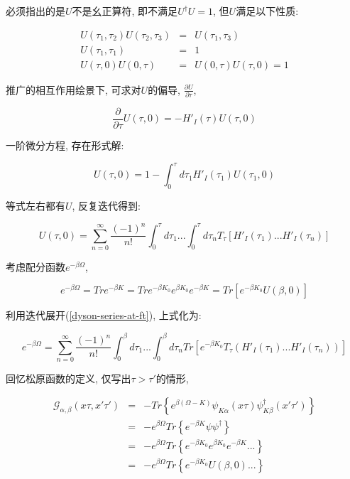 必须指出的是$U$不是幺正算符, 即不满足$U^\dagger U =1$,
但$U$满足以下性质:

\begin{eqnarray*}
  U(\tau_1, \tau_2) U(\tau_2, \tau_3) &=& U(\tau_1, \tau_3) \\
  U(\tau_1, \tau_1) &=& 1 \\
  U(\tau, 0)U(0, \tau) &=& U(0, \tau) U(\tau, 0) =  1
\end{eqnarray*}

推广的相互作用绘景下, 可求对$U$的偏导, $\frac{\partial U}{\partial
\tau}$,

\begin{equation}\label{time-evolution-of-U-tau}
\frac{\partial }{\partial \tau} U (\tau, 0) = - H'_I (\tau) U(\tau,
0)
\end{equation}

一阶微分方程, 存在形式解:

\begin{equation*}
U(\tau, 0) = 1 - \int_0^\tau d\tau_1 H'_I (\tau_1) U(\tau_1,0)
\end{equation*}

等式左右都有$U$, 反复迭代得到:

\begin{equation}\label{dyson-series-at-ft}
U(\tau,0) = \sum_{n=0}^\infty \frac{(-1)^n}{n!} \int_0^\tau d\tau_1
...\int_0^\tau d\tau_n T_\tau \left[ H'_I(\tau_1)...H'_I (\tau_n)
\right]
\end{equation}

考虑配分函数$e^{-\beta \Omega}$,

\begin{equation*}
e^{-\beta \Omega} = Tr e^{-\beta K} = Tr e^{-\beta K_0} e^{\beta
K_0} e^{-\beta K} = Tr \left[ e^{-\beta K_0} U(\beta , 0) \right]
\end{equation*}

利用迭代展开(\ref{dyson-series-at-ft}), 上式化为:

\begin{equation*}
e^{-\beta \Omega} = \sum_{n=0}^{\infty} \frac{(-1)^n}{n!}
\int_0^\beta d\tau_1 ... \int_0^\beta d\tau_n Tr \left[ e^{-\beta
K_0} T_\tau \left( H'_I(\tau_1)...H'_I(\tau_n) \right) \right]
\end{equation*}

回忆松原函数的定义, 仅写出$\tau > \tau'$的情形,

\begin{eqnarray*}
  \mathcal{ G }_{\alpha, \beta}(x\tau,x'\tau') &=& - Tr \left\{e^{\beta(\Omega - K)} \psi_{K\alpha}(x\tau) \psi_{K\beta}^\dagger(x'\tau') \right\} \\
  {} &=& - e^{\beta \Omega} Tr \left\{ e^{-\beta K} \psi \psi^\dagger \right\} \\
  {} &=& - e^{\beta \Omega} Tr \left\{ e^{-\beta K_0} e^{\beta K_0} e^{-\beta K} ...
  \right\} \\
  {} &=& - e^{\beta \Omega} Tr \left\{ e^{-\beta K_0} U(\beta, 0) ...
  \right\}
\end{eqnarray*}

